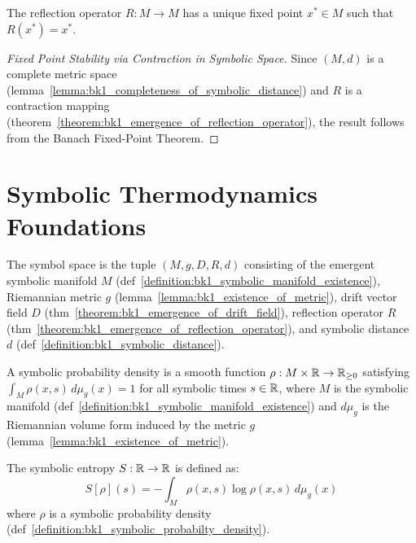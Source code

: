 \begin{corollary}
\label{corollary:bk1_fixed_point}
The reflection operator $R: M \to M$ has a unique fixed point $x^* \in M$ such that $R(x^*) = x^*$.

\begin{proof}[Fixed Point Stability via Contraction in Symbolic Space]
\label{proof:bk1_fixed_point_contraction_stability}
Since $(M,d)$ is a complete metric space (lemma~\ref{lemma:bk1_completeness_of_symbolic_distance}) and $R$ is a contraction mapping (theorem~\ref{theorem:bk1_emergence_of_reflection_operator}), the result follows from the Banach Fixed-Point Theorem.
\end{proof}
\end{corollary}
\section{Symbolic Thermodynamics Foundations}
\label{sec:bk1_symbolic_thermodynamics_foundations}

\begin{definition}
\label{definition:bk1_symbol_space}
The symbol space is the tuple $(M, g, D, R, d)$ consisting of the emergent symbolic manifold $M$ (def~\ref{definition:bk1_symbolic_manifold_existence}), Riemannian metric $g$ (lemma~\ref{lemma:bk1_existence_of_metric}), drift vector field $D$ (thm~\ref{theorem:bk1_emergence_of_drift_field}), reflection operator $R$ (thm~\ref{theorem:bk1_emergence_of_reflection_operator}), and symbolic distance $d$ (def~\ref{definition:bk1_symbolic_distance}).
\end{definition}

\begin{definition}
\label{definition:bk1_symbolic_probabilty_density}
A symbolic probability density is a smooth function $\rho: M \times \mathbb{R} \to \mathbb{R}_{\geq 0}$ satisfying $\int_M \rho(x,s) \, d\mu_g(x) = 1$ for all symbolic times $s \in \mathbb{R}$, where $M$ is the symbolic manifold (def~\ref{definition:bk1_symbolic_manifold_existence}) and $d\mu_g$ is the Riemannian volume form induced by the metric $g$ (lemma~\ref{lemma:bk1_existence_of_metric}).
\end{definition}

\begin{definition}
\label{definition:bk1_symbolic_entropy}
The symbolic entropy \( S: \mathbb{R} \to \mathbb{R} \) is defined as:
\[
S[\rho](s) = -\int_M \rho(x,s) \log \rho(x,s) \, d\mu_g(x)
\]
where $\rho$ is a symbolic probability density (def~\ref{definition:bk1_symbolic_probabilty_density}).
\end{definition}

